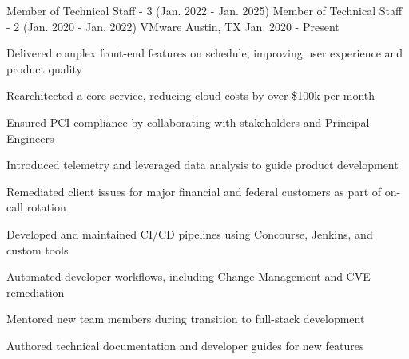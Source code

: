 \begin{cventryroles}
  \cventryroles
    {Member of Technical Staff - 3 (Jan. 2022 - Jan. 2025)}
    {Member of Technical Staff - 2 (Jan. 2020 - Jan. 2022)}
    {VMware} %
    {Austin, TX} %
    {Jan. 2020 - Present}
    {
      \begin{cvitems}
        \item {Delivered complex front-end features on schedule, improving user experience and product quality}
        \item {Rearchitected a core service, reducing cloud costs by over \$100k per month}
        \item {Ensured PCI compliance by collaborating with stakeholders and Principal Engineers}
        \item {Introduced telemetry and leveraged data analysis to guide product development}
        \item {Remediated client issues for major financial and federal customers as part of on-call rotation}
        \item {Developed and maintained CI/CD pipelines using Concourse, Jenkins, and custom tools}
        \item {Automated developer workflows, including Change Management and CVE remediation}
        \item {Mentored new team members during transition to full-stack development}
        \item {Authored technical documentation and developer guides for new features}
      \end{cvitems}
    }
\end{cventryroles}
